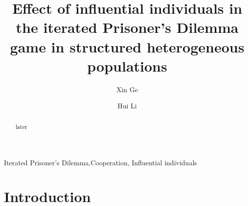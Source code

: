 \documentclass[preprint,12pt,3p]{elsarticle}
\begin{document}
\begin{frontmatter}

\title{Effect of influential individuals in the iterated Prisoner's Dilemma game in structured heterogeneous populations}

\author[label1]{Xin Ge}
\address[label1]{DaLian Maritime University, School of Information Science and
technology, DaLian 116026, P.R. China}
\address[label2]{Address Two}



\author[label2]{Hui Li}
\address[label5]{Some University}


\begin{abstract}
later
\end{abstract}

\begin{keyword}
Iterated Prisoner’s Dilemma,Cooperation, Influential individuals
\end{keyword}

\end{frontmatter}

\newcommand{\cooplevel}{Asymptotic density of cooperators $\mathcal{C}$ on the T-S plane}

\section{Introduction}
\end{document}
